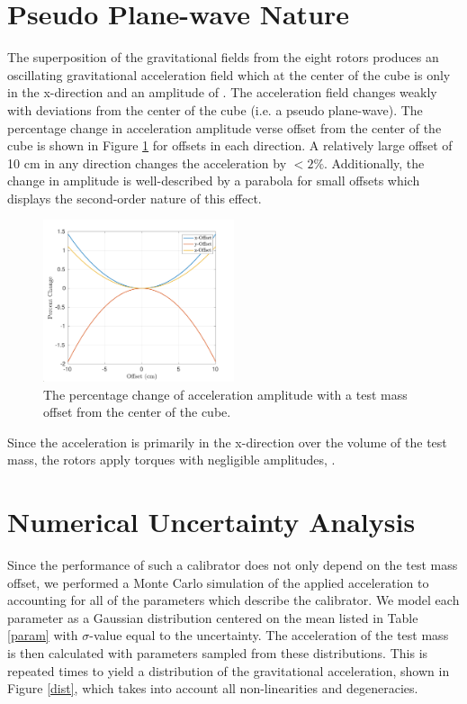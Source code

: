 \documentclass[twocolumn]{revtex4-1}
\begin{document}
\section{Pseudo Plane-wave Nature}

The superposition of the gravitational fields from the eight rotors produces an oscillating gravitational acceleration field which at the center of the cube is only in the x-direction and an amplitude of . The acceleration field changes weakly with deviations from the center of the cube (i.e. a pseudo plane-wave). The percentage change in acceleration amplitude verse offset from the center of the cube is shown in Figure \ref{offset} for offsets in each direction. A relatively large offset of 10 cm in any direction changes the acceleration by $<2\%$. Additionally, the change in amplitude is well-described by a parabola for small offsets which displays the second-order nature of this effect. 


\begin{figure}[!h]
\centering \includegraphics[width=0.5\textwidth]{Super8_PerVsZ.pdf}
\caption{The percentage change of acceleration amplitude with a test mass offset from the center of the cube.}
\label{offset} 
\end{figure}

Since the acceleration is primarily in the x-direction over the volume of the test mass, the rotors apply torques with negligible amplitudes, .

\section{Numerical Uncertainty Analysis}

Since the performance of such a calibrator does not only depend on the test mass offset, we performed a Monte Carlo simulation of the applied acceleration to accounting for all of the parameters which describe the calibrator. We model each parameter as a Gaussian distribution centered on the mean listed in Table \ref{param} with $\sigma$-value equal to the uncertainty. The acceleration of the test mass is then calculated with parameters sampled from these distributions. This is repeated  times to yield a distribution of the gravitational acceleration, shown in Figure \ref{dist}, which takes into account all non-linearities and degeneracies. 
\end{document}
